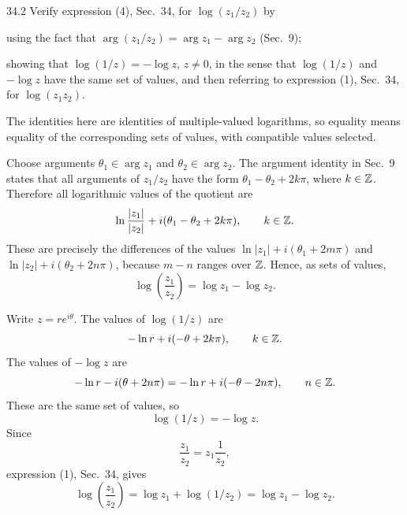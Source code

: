 \documentclass[11pt,oneside]{article}
\begin{document}
\begin{exercise}{34.2}
Verify expression (4), Sec.~34, for \(\log(z_1/z_2)\) by
\begin{exercisesubparts}
    \item using the fact that \(\arg(z_1/z_2)=\arg z_1-\arg z_2\) (Sec.~9);
    \item showing that \(\log(1/z)=-\log z\), \(z\ne0\), in the sense that \(\log(1/z)\) and \(-\log z\) have the same set of values, and then referring to expression (1), Sec.~34, for \(\log(z_1z_2)\).
\end{exercisesubparts}
\end{exercise}

\begin{solution}
The identities here are identities of multiple-valued logarithms, so equality means equality of the corresponding sets of values, with compatible values selected.
\begin{exercisesubparts}
    \item Choose arguments \(\theta_1\in\arg z_1\) and \(\theta_2\in\arg z_2\). The argument identity in Sec.~9 states that all arguments of \(z_1/z_2\) have the form \(\theta_1-\theta_2+2k\pi\), where \(k\in\mathbb{Z}\). Therefore all logarithmic values of the quotient are
    \[
        \ln\frac{|z_1|}{|z_2|}
        +i(\theta_1-\theta_2+2k\pi),
        \qquad k\in\mathbb{Z}.
    \]
    These are precisely the differences of the values
    \(\ln|z_1|+i(\theta_1+2m\pi)\) and
    \(\ln|z_2|+i(\theta_2+2n\pi)\), because \(m-n\) ranges over \(\mathbb{Z}\). Hence, as sets of values,
    \[
        \boxed{\log\left(\frac{z_1}{z_2}\right)=\log z_1-\log z_2}.
    \]

    \item Write \(z=re^{i\theta}\). The values of \(\log(1/z)\) are
    \[
        -\ln r+i(-\theta+2k\pi),
        \qquad k\in\mathbb{Z}.
    \]
    The values of \(-\log z\) are
    \[
        -\ln r-i(\theta+2n\pi)
        =-\ln r+i(-\theta-2n\pi),
        \qquad n\in\mathbb{Z}.
    \]
    These are the same set of values, so
    \[
        \log(1/z)=-\log z.
    \]
    Since
    \[
        \frac{z_1}{z_2}=z_1\frac1{z_2},
    \]
    expression (1), Sec.~34, gives
    \[
        \log\left(\frac{z_1}{z_2}\right)
        =\log z_1+\log(1/z_2)
        =\boxed{\log z_1-\log z_2}.
    \]
\end{exercisesubparts}
\end{solution}
\end{document}
